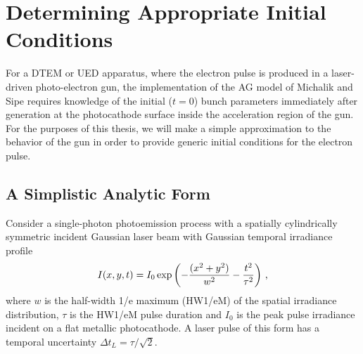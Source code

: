 
\section{Determining Appropriate Initial Conditions} \label{sec:initial_conditions}
For a DTEM or UED apparatus, where the electron pulse is produced in a laser-driven photo-electron gun, the implementation of the AG model of Michalik and Sipe \cite{michalik_analytic_2006} requires knowledge of the initial ($ t = 0 $) bunch parameters immediately after generation at the photocathode surface inside the acceleration region of the gun.
For the purposes of this thesis, we will make a simple approximation to the behavior of the gun in order to provide generic initial conditions for the electron pulse.

\subsection{A Simplistic Analytic Form} 

Consider a single-photon photoemission process with a spatially cylindrically symmetric incident Gaussian laser beam with Gaussian temporal irradiance profile 
\begin{equation}\label{eq:laser_form}
I ( x , y , t ) = I_{0} \exp \left ( - \frac{ ( x^{2} +y^{2} ) }{ w^{2} } - \frac{ t^{ 2 } }{ \tau^{ 2 } } \right ) \, \text{,}
\end{equation}
where $w$ is the half-width 1/e maximum (HW1/eM) of the spatial irradiance distribution, $\tau$ is the HW1/eM pulse duration and $I_{0}$ is the peak pulse irradiance incident on a flat metallic photocathode.
A laser pulse of this form has a temporal uncertainty $ \Delta t_{L} = \tau / \sqrt{2} $.

